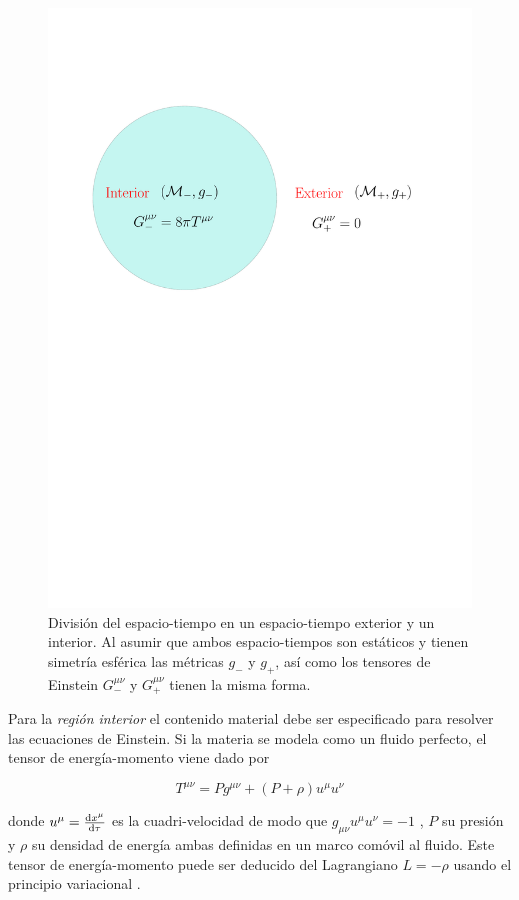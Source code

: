 \begin{figure}[H]
    \centering
    \includegraphics[width=0.7\linewidth]{figures/GR.pdf}
    \caption[División del espacio-tiempo]{División del espacio-tiempo en un espacio-tiempo exterior y un interior. Al asumir que ambos espacio-tiempos son estáticos y tienen simetría esférica las métricas $g_{-}$ y $g_{+}$, así como los tensores de Einstein $G^{\mu \nu}_{-}$ y $G^{\mu \nu}_{+}$ tienen la misma forma.}
    \label{STDiv}
\end{figure}

Para la \textit{región interior} el contenido material debe ser especificado para resolver las ecuaciones de Einstein. Si la materia se modela como un fluido perfecto, el tensor de energía-momento viene dado por

\begin{equation}\label{EMT}
    T ^ { \mu \nu } =  P g ^ { \mu \nu } + ( P + \rho ) u ^ { \mu } u ^ { \nu }
\end{equation}

donde $u^{\mu}=\dv{x^{\mu}}{\tau}$ es la cuadri-velocidad de modo que $g _ { \mu \nu } u ^ { \mu } u ^ { \nu } = -1$ , $P$ su presión y $\rho$ su densidad de energía ambas definidas en un marco comóvil al fluido. Este tensor de energía-momento puede ser deducido del Lagrangiano $L=-\rho$ usando el principio variacional \cite{Felice19992}.

